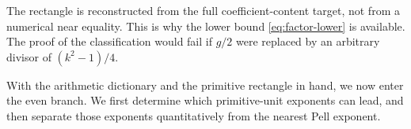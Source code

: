 \begin{remark}
The rectangle is reconstructed from the full coefficient-content target,
not from a numerical near equality. This is why the lower bound
\cref{eq:factor-lower} is available. The proof of the classification would
fail if $g/2$ were replaced by an arbitrary divisor of
$(k^2-1)/4$.
\end{remark}

With the arithmetic dictionary and the primitive rectangle in hand, we now
enter the even branch. We first determine which primitive-unit exponents can
lead, and then separate those exponents quantitatively from the nearest Pell
exponent.

